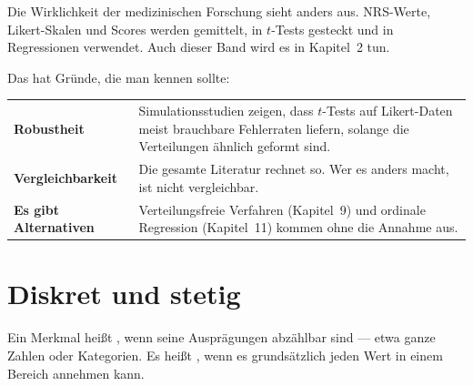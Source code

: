 \begin{warnung}
Die Wirklichkeit der medizinischen Forschung sieht anders aus. NRS-Werte, Likert-Skalen und Scores werden gemittelt, in $t$-Tests gesteckt und in Regressionen verwendet. Auch dieser Band wird es in Kapitel~2 tun.

Das hat Gründe, die man kennen sollte:

\begin{center}
\renewcommand{\arraystretch}{1.5}
\begin{tabular}{@{}P{3.0cm}P{5.6cm}@{}}
\toprule
\textbf{Robustheit} & Simulationsstudien zeigen, dass $t$-Tests auf Likert-Daten meist brauchbare Fehlerraten liefern, solange die Verteilungen ähnlich geformt sind.\\
\textbf{Vergleich\-barkeit} & Die gesamte Literatur rechnet so. Wer es anders macht, ist nicht vergleichbar.\\
\textbf{Es gibt Alternativen} & Verteilungsfreie Verfahren (Kapitel~9) und ordinale Regression (Kapitel~11) kommen ohne die Annahme aus.\\
\bottomrule
\end{tabular}
\end{center}

\begin{center}
\begin{minipage}{0.88\textwidth}
\end{minipage}
\end{center}
\end{warnung}

\section{Diskret und stetig}

\begin{definition}
Ein Merkmal heißt , wenn seine Ausprägungen abzählbar sind --- etwa ganze Zahlen oder Kategorien. Es heißt , wenn es grundsätzlich jeden Wert in einem Bereich annehmen kann.
\end{definition}

